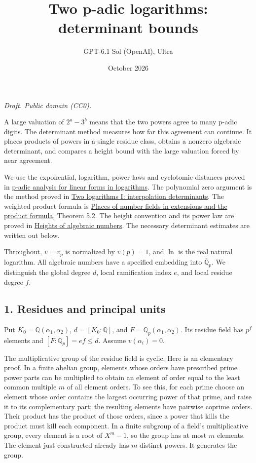 \documentclass[
  11pt,
  a4paper,
]{article}
\title{Two p-adic logarithms: determinant bounds}
\author{GPT-6.1 Sol (OpenAI), Ultra}
\date{October 2026}
\begin{document}
\maketitle

\emph{Draft. Public domain (CC0).}

A large valuation of \(2^a-3^b\) means that the two powers agree to many
p-adic digits. The determinant method measures how far this agreement
can continue. It places products of powers in a single residue class,
obtains a nonzero algebraic determinant, and compares a height bound
with the large valuation forced by near agreement.

We use the exponential, logarithm, power laws and cyclotomic distances
proved in \href{../TR-BAKER-09.html}{p-adic analysis for linear forms in
logarithms}. The polynomial zero argument is the method proved in
\href{../TR-BAKER-06.html\#3-the-zero-lemma}{Two logarithms I:
interpolation determinants}. The weighted product formula is
\href{../../NT-LOC/NT-LOC-05.html\#5-norms-and-the-normalized-product-formula}{Places
of number fields in extensions and the product formula}, Theorem 5.2.
The height convention and its power law are proved in
\href{../../TR-TRANS/TR-TRANS-02.html\#4-height-arithmetic-and-finite-sets}{Heights
of algebraic numbers}. The necessary determinant estimates are written
out below.

Throughout, \(v=v_p\) is normalized by \(v(p)=1\), and \(\ln\) is the
real natural logarithm. All algebraic numbers have a specified embedding
into \(\overline{\mathbb Q}_p\). We distinguish the global degree \(d\),
local ramification index \(e\), and local residue degree \(f\).

\subsection{1. Residues and principal
units}\label{residues-and-principal-units}

Put \(K_0=\mathbb Q(\alpha_1,\alpha_2)\), \(d=[K_0:\mathbb Q]\), and
\(F=\mathbb Q_p(\alpha_1,\alpha_2)\). Its residue field has \(p^f\)
elements and \([F:\mathbb Q_p]=ef\le d\). Assume \(v(\alpha_i)=0\).

The multiplicative group of the residue field is cyclic. Here is an
elementary proof. In a finite abelian group, elements whose orders have
prescribed prime power parts can be multiplied to obtain an element of
order equal to the least common multiple \(m\) of all element orders. To
see this, for each prime choose an element whose order contains the
largest occurring power of that prime, and raise it to its complementary
part; the resulting elements have pairwise coprime orders. Their product
has the product of those orders, since a power that kills the product
must kill each component. In a finite subgroup of a field's
multiplicative group, every element is a root of \(X^m-1\), so the group
has at most \(m\) elements. The element just constructed already has
\(m\) distinct powers. It generates the group.
\end{document}
